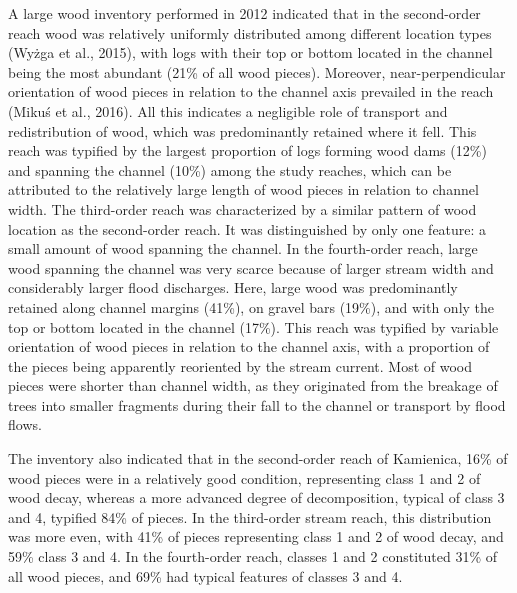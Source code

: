 {A large wood inventory performed in 2012 indicated that in the second-order reach wood was relatively uniformly distributed among different location types (Wyżga et al., 2015), with logs with their top or bottom located in the channel being the most abundant (21\% of all wood pieces). Moreover, near-perpendicular orientation of wood pieces in relation to the channel axis prevailed in the reach (Mikuś et al., 2016). All this indicates a negligible role of transport and redistribution of wood, which was predominantly retained where it fell. This reach was typified by the largest proportion of logs forming wood dams (12\%) and spanning the channel (10\%) among the study reaches, which can be attributed to the relatively large length of wood pieces in relation to channel width. The third-order reach was characterized by a similar pattern of wood location as the second-order reach. It was distinguished by only one feature: a small amount of wood spanning the channel. In the fourth-order reach, large wood spanning the channel was very scarce because of larger stream width and considerably larger flood discharges. Here, large wood was predominantly retained along channel margins (41\%), on gravel bars (19\%), and with only the top or bottom located in the channel (17\%). This reach was typified by variable orientation of wood pieces in relation to the channel axis, with a proportion of the pieces being apparently reoriented by the stream current. Most of wood pieces were shorter than channel width, as they originated from the breakage of trees into smaller fragments during their fall to the channel or transport by flood flows. 

The inventory also indicated that in the second-order reach of Kamienica, 16\% of wood pieces were in a relatively good condition, representing class 1 and 2 of wood decay, whereas a more advanced degree of decomposition, typical of class 3 and 4, typified 84\% of pieces. In the third-order stream reach, this distribution was more even, with 41\% of pieces representing class 1 and 2 of wood decay, and 59\% class 3 and 4. In the fourth-order reach, classes 1 and 2 constituted 31\% of all wood pieces, and 69\% had typical features of classes 3 and 4.

}
